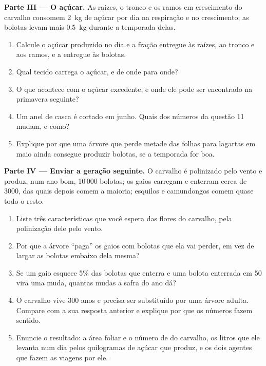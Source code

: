 \begin{problem}
\medskip
\noindent\textbf{Parte III --- O açúcar.}
As raízes, o tronco e os ramos em crescimento do carvalho consomem
\qty{2}{kg} de açúcar por dia na respiração e no crescimento; as
bolotas levam mais \qty{0.5}{kg} durante a temporada
delas.
\begin{enumerate}[resume]
  \item Calcule o açúcar produzido no dia e a fração entregue às
        raízes, ao tronco e aos ramos, e a entregue às bolotas.
  \item Qual tecido carrega o açúcar, e de onde para onde?
  \item O que acontece com o açúcar excedente, e onde ele pode ser
        encontrado na primavera seguinte?
  \item Um anel de casca é cortado em junho. Quais dos números da
        questão 11 mudam, e como?
  \item Explique por que uma árvore que perde metade das folhas para
        lagartas em maio ainda consegue produzir bolotas, se a
        temporada for boa.
\end{enumerate}

\medskip
\noindent\textbf{Parte IV --- Enviar a geração seguinte.}
O carvalho é polinizado pelo vento e produz, num ano bom, 10\,000
bolotas; os gaios carregam e enterram cerca de 3000, das quais depois
comem a maioria; esquilos e camundongos comem quase todo o resto.
\begin{enumerate}[resume]
  \item Liste três características que você espera das flores do
        carvalho, pela polinização dele pelo vento.
  \item Por que a árvore ``paga'' os gaios com bolotas que ela vai
        perder, em vez de largar as bolotas embaixo dela mesma?
  \item Se um gaio esquece 5\% das bolotas que enterra e uma bolota
        enterrada em 50 vira uma muda, quantas mudas a safra do ano dá?
  \item O carvalho vive 300 anos e precisa ser substituído por uma
        árvore adulta. Compare com a sua resposta anterior e explique
        por que os números fazem sentido.
  \item Enuncie o resultado: a área foliar e o número de  do
        carvalho, os litros que ele levanta num dia pelos quilogramas
        de açúcar que produz, e os dois agentes que fazem as viagens por ele.
\end{enumerate}
\end{problem}

